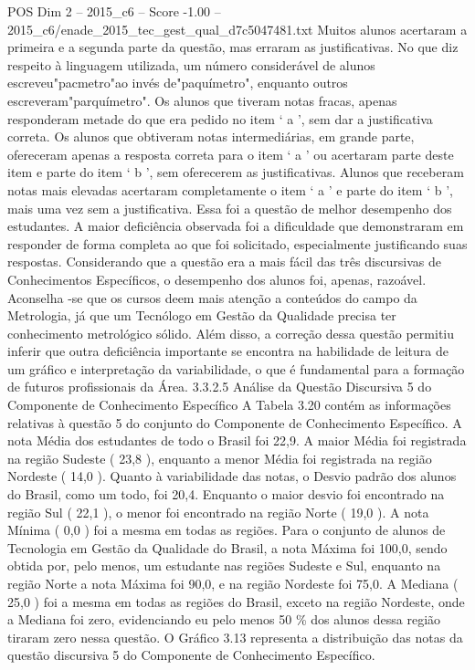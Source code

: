 \begin{textsample}{POS Dim 2 – 2015\_c6 – Score -1.00 – 2015\_c6/enade\_2015\_tec\_gest\_qual\_d7c5047481.txt}
Muitos alunos acertaram a primeira e a segunda parte da questão, mas erraram as justificativas.
No que diz respeito à linguagem utilizada, um número considerável de alunos escreveu"pacmetro"ao invés de"paquímetro", enquanto outros escreveram"parquímetro".
Os alunos que tiveram notas fracas, apenas responderam metade do que era pedido no item ‘ a ’, sem dar a justificativa correta.
Os alunos que obtiveram notas intermediárias, em grande parte, ofereceram apenas a resposta correta para o item ‘ a ’ ou acertaram parte deste item e parte do item ‘ b ’, sem oferecerem as justificativas.
Alunos que receberam notas mais elevadas acertaram completamente o item ‘ a ’ e parte do item ‘ b ’, mais uma vez sem a justificativa.
Essa foi a questão de melhor desempenho dos estudantes.
A maior deficiência observada foi a dificuldade que demonstraram em responder de forma completa ao que foi solicitado, especialmente justificando suas respostas.
Considerando que a questão era a mais fácil das três discursivas de Conhecimentos Específicos, o desempenho dos alunos foi, apenas, razoável.
Aconselha -se que os cursos deem mais atenção a conteúdos do campo da Metrologia, já que um Tecnólogo em Gestão da Qualidade precisa ter conhecimento metrológico sólido.
Além disso, a correção dessa questão permitiu inferir que outra deficiência importante se encontra na habilidade de leitura de um gráfico e interpretação da variabilidade, o que é fundamental para a formação de futuros profissionais da Área. 3.3.2.5 Análise da Questão Discursiva 5 do Componente de Conhecimento Específico A Tabela 3.20 contém as informações relativas à questão 5 do conjunto do Componente de Conhecimento Específico.
A nota Média dos estudantes de todo o Brasil foi 22,9.
A maior Média foi registrada na região Sudeste ( 23,8 ), enquanto a menor Média foi registrada na região Nordeste ( 14,0 ).
Quanto à variabilidade das notas, o Desvio padrão dos alunos do Brasil, como um todo, foi 20,4.
Enquanto o maior desvio foi encontrado na região Sul ( 22,1 ), o menor foi encontrado na região Norte ( 19,0 ).
A nota Mínima ( 0,0 ) foi a mesma em todas as regiões.
Para o conjunto de alunos de Tecnologia em Gestão da Qualidade do Brasil, a nota Máxima foi 100,0, sendo obtida por, pelo menos, um estudante nas regiões Sudeste e Sul, enquanto na região Norte a nota Máxima foi 90,0, e na região Nordeste foi 75,0.
A Mediana ( 25,0 ) foi a mesma em todas as regiões do Brasil, exceto na região Nordeste, onde a Mediana foi zero, evidenciando eu pelo menos 50 \% dos alunos dessa região tiraram zero nessa questão.
O Gráfico 3.13 representa a distribuição das notas da questão discursiva 5 do Componente de Conhecimento Específico.

\end{textsample}
